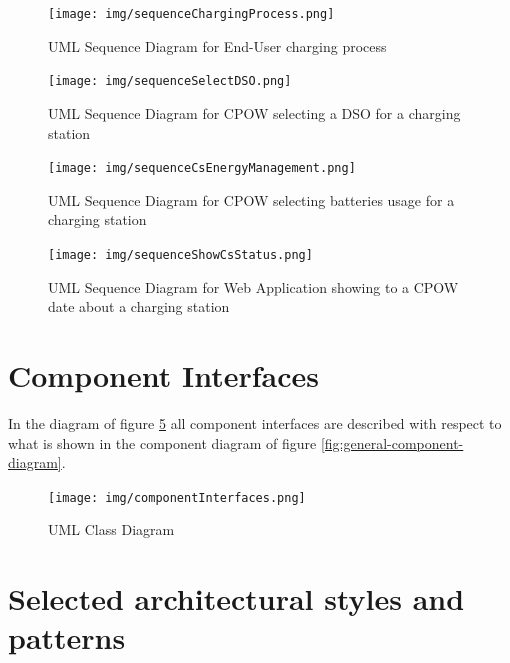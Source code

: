 \documentclass[a4paper]{report}
\begin{document}
\begin{landscape}
\begin{figure}[hp]
\centering
\texttt{[image: img/sequenceChargingProcess.png]}
\caption{UML Sequence Diagram for End-User charging process}
\label{fig:seq-charge}
\end{figure}
\end{landscape}

\begin{landscape}
\begin{figure}[hp]
\centering
\texttt{[image: img/sequenceSelectDSO.png]}
\caption{UML Sequence Diagram for CPOW selecting a DSO for a charging station}
\label{fig:seq-selectDSO}
\end{figure}
\end{landscape}

\begin{landscape}
\begin{figure}[hp]
\centering
\texttt{[image: img/sequenceCsEnergyManagement.png]}
\caption{UML Sequence Diagram for CPOW selecting batteries usage for a charging station}
\label{fig:seq-energyManagement}
\end{figure}
\end{landscape}

\begin{landscape}
\begin{figure}[hp]
\centering
\texttt{[image: img/sequenceShowCsStatus.png]}
\caption{UML Sequence Diagram for Web Application showing to a CPOW date about a charging station}
\label{fig:seq-csStatus}
\end{figure}
\end{landscape}

\section{Component Interfaces}
In the diagram of figure \ref{fig:componentInterfaces} all component interfaces are described with respect to what is shown in the component diagram of figure \ref{fig:general-component-diagram}.

\begin{figure}[htp]
\texttt{[image: img/componentInterfaces.png]}
\caption{UML Class Diagram}
\label{fig:componentInterfaces}
\end{figure}

\section{Selected architectural styles and patterns}
\end{document}
